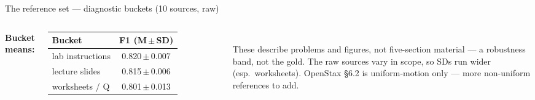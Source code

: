 \documentclass[aspectratio=169,10pt]{beamer}
\begin{document}
\begin{frame}{The reference set --- diagnostic buckets (10 sources, raw)}
\begin{columns}[T]
{\tiny\textbf{Bucket means:}}\\[2pt]
{\tiny
\begin{tabular}{lc}
\toprule
\textbf{Bucket} & \textbf{F1 (M\,$\pm$\,SD)} \\
\midrule
lab instructions & 0.820\,$\pm$\,0.007 \\
lecture slides   & 0.815\,$\pm$\,0.006 \\
worksheets / Q   & 0.801\,$\pm$\,0.013 \\
\bottomrule
\end{tabular}}\\[4pt]
{\tiny These describe problems and figures, not five-section material --- a robustness band, not
the gold. The raw sources vary in scope, so SDs run wider (esp.\ worksheets). OpenStax \S6.2 is
uniform-motion only --- more non-uniform references to add.}
\end{columns}
\end{frame}
\end{document}
